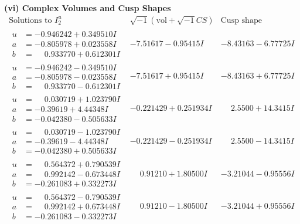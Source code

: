 \documentclass[1p]{elsarticle_modified}
\theoremstyle{definition}
\newcommand{\I}{\sqrt{-1}}
\begin{document}
\newpage\flushleft \textbf{(vi) Complex Volumes and Cusp Shapes}
$$\begin{array}{c|c|c}  
\text{Solutions to }I^u_{2}& \I (\text{vol} + \sqrt{-1}CS) & \text{Cusp shape}\\
 \hline 
\begin{aligned}
u &= -0.946242 + 0.349510 I \\
a &= -0.805978 + 0.023558 I \\
b &= \phantom{-}0.933770 + 0.612301 I\end{aligned}
 & -7.51617 - 0.95415 I & -8.43163 - 6.77725 I \\ \hline\begin{aligned}
u &= -0.946242 - 0.349510 I \\
a &= -0.805978 - 0.023558 I \\
b &= \phantom{-}0.933770 - 0.612301 I\end{aligned}
 & -7.51617 + 0.95415 I & -8.43163 + 6.77725 I \\ \hline\begin{aligned}
u &= \phantom{-}0.030719 + 1.023790 I \\
a &= -0.39619 + 4.44348 I \\
b &= -0.042380 - 0.505633 I\end{aligned}
 & -0.221429 + 0.251934 I & \phantom{-}2.5500 + 14.3415 I \\ \hline\begin{aligned}
u &= \phantom{-}0.030719 - 1.023790 I \\
a &= -0.39619 - 4.44348 I \\
b &= -0.042380 + 0.505633 I\end{aligned}
 & -0.221429 - 0.251934 I & \phantom{-}2.5500 - 14.3415 I \\ \hline\begin{aligned}
u &= \phantom{-}0.564372 + 0.790539 I \\
a &= \phantom{-}0.992142 - 0.673448 I \\
b &= -0.261083 + 0.332273 I\end{aligned}
 & \phantom{-}0.91210 + 1.80500 I & -3.21044 - 0.95556 I \\ \hline\begin{aligned}
u &= \phantom{-}0.564372 - 0.790539 I \\
a &= \phantom{-}0.992142 + 0.673448 I \\
b &= -0.261083 - 0.332273 I\end{aligned}
 & \phantom{-}0.91210 - 1.80500 I & -3.21044 + 0.95556 I \\ \hline\begin{aligned}

\end{aligned}
\end{array}$$
\end{document}
